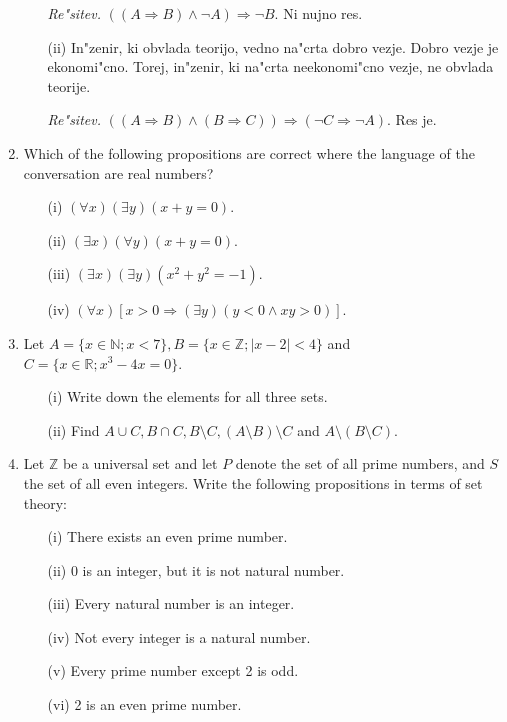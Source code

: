 \documentclass[11pt,paper=b5,footinclude,headinclude]{scrbook} %
\theoremstyle{remark}
\theoremstyle{definition} %
\theoremstyle{theorem} %
\begin{document}
\begin{enumerate}
\begin{enumerate}
\emph{ Re"sitev.} $((A\Rightarrow B) \wedge \neg A) \Rightarrow \neg B$. Ni nujno res.

\item[(ii)] In"zenir, ki obvlada teorijo, vedno na"crta dobro vezje. Dobro vezje je ekonomi"cno. Torej, in"zenir, ki na"crta neekonomi"cno vezje, ne obvlada teorije. 

\emph{ Re"sitev.} $((A\Rightarrow B) \wedge (B\Rightarrow C)) \Rightarrow (\neg C \Rightarrow \neg A)$. Res je.
\end{enumerate}





\item Which of the following propositions are correct where the language of the conversation are real numbers?
\begin{enumerate}
\item[(i)] $(\forall x)(\exists y)(x+y=0)$.
\item[(ii)] $(\exists x)(\forall y)(x+y=0)$.
\item[(iii)] $(\exists x)(\exists y)(x^2+y^2 =-1)$.
\item[(iv)] $(\forall x)[x>0 \Rightarrow (\exists y)(y<0 \wedge xy>0)]$.
\end{enumerate} 




\item Let $A = \{ x \in \mathbb{N}; x < 7\}, B = \{x \in  \mathbb{Z}; |x - 2| < 4\}$ and $C = \{x \in\mathbb{R}; x^3 -  4x = 0\}$.
\begin{enumerate}
\item[(i)]  Write down the elements for all three sets.
\item[(ii)] Find $A \cup C, B \cap C, B \setminus C, (A \setminus B) \setminus C$ and $A \setminus (B \setminus C)$.
\end{enumerate}

\item Let  $\mathbb{Z}$ be a universal set and let  $P$ denote the set of all prime numbers, and $S$ the set of all even integers. Write the following propositions in terms of set theory:
\begin{itemize}
\item[(i)] There exists an even prime number. 
\item[(ii)] $0$ is an integer, but it is not natural number. 
\item[(iii)] Every natural number is an integer. 
\item[(iv)] Not every integer is a natural number. 
\item[(v)] Every prime number except 2 is odd. 
\item[(vi)] 2 is an even prime number. \quad [$2\in S\cap P$]
\end{itemize}


\end{enumerate}
\end{document}
